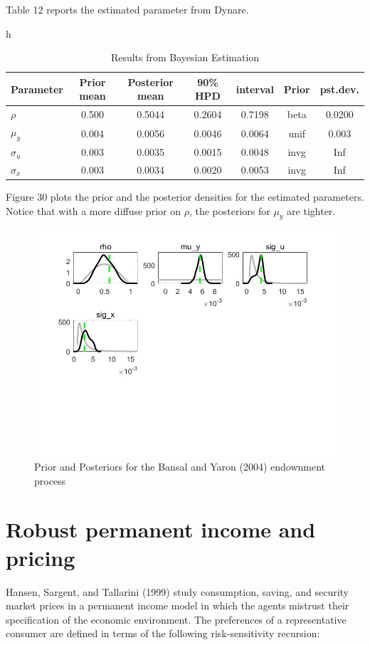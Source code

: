 \documentclass[a4paper,12pt]{scrartcl} %
\begin{document}
Table 12 reports the estimated parameter from Dynare.

\begin{table}{h}
\centering
\caption{Results from Bayesian Estimation}\label{12}
\begin{tabular}{lcccccc}
\hline
Parameter&Prior mean&Posterior mean&90\% HPD&interval&Prior&pst.dev.\\
\hline
$\rho$&0.500&0.5044&0.2604&0.7198&beta&0.0200\\
$\mu_y$&0.004&0.0056&0.0046&0.0064&unif&0.003\\
$\sigma_u$&0.003&0.0035&0.0015&0.0048&invg&Inf\\
$\sigma_x$&0.003&0.0034&0.0020&0.0053&invg&Inf\\
\hline
\end{tabular}
\end{table}

Figure 30 plots the prior and the posterior densities for the estimated parameters. Notice that with a more diffuse prior on $\rho$, the posteriors for $\mu_y$ are tighter.

\begin{figure}[htbp!]
		\centering
			\includegraphics[width=0.8\linewidth]{fig31.jpg}
            \caption{Prior and Posteriors for the Bansal and Yaron (2004) endownment process}\label{31}
\end{figure}

\section{Robust permanent income and pricing}

Hansen, Sargent, and Tallarini (1999) study consumption, saving, and security market prices in a permanent income
model in which the agents mistrust their specification of the economic environment. The preferences of a representative consumer are defined in terms of the following risk-sensitivity recursion:
\end{document}
